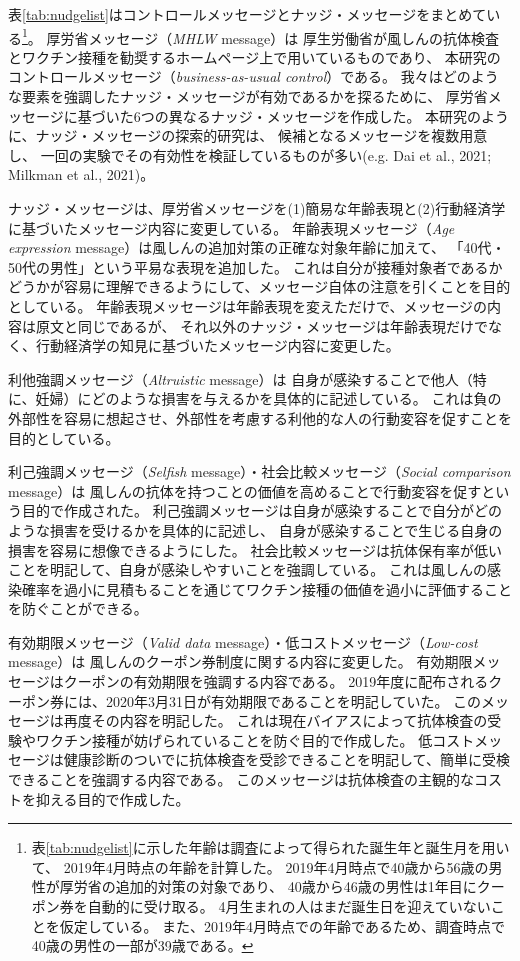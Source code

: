 \documentclass[
  11pt,
  a4paper,
]{article}
\begin{document}
表\ref{tab:nudgelist}はコントロールメッセージとナッジ・メッセージをまとめている\footnote{表\ref{tab:nudgelist}に示した年齢は調査によって得られた誕生年と誕生月を用いて、
  2019年4月時点の年齢を計算した。
  2019年4月時点で40歳から56歳の男性が厚労省の追加的対策の対象であり、
  40歳から46歳の男性は1年目にクーポン券を自動的に受け取る。
  4月生まれの人はまだ誕生日を迎えていないことを仮定している。
  また、2019年4月時点での年齢であるため、調査時点で40歳の男性の一部が39歳である。}。
厚労省メッセージ（\emph{MHLW} message）は
厚生労働省が風しんの抗体検査とワクチン接種を勧奨するホームページ上で用いているものであり、
本研究のコントロールメッセージ（\emph{business-as-usual control}）である。
我々はどのような要素を強調したナッジ・メッセージが有効であるかを探るために、
厚労省メッセージに基づいた6つの異なるナッジ・メッセージを作成した。
本研究のように、ナッジ・メッセージの探索的研究は、
候補となるメッセージを複数用意し、
一回の実験でその有効性を検証しているものが多い(e.g. Dai et al., 2021; Milkman et al., 2021)。

ナッジ・メッセージは、厚労省メッセージを(1)簡易な年齢表現と(2)行動経済学に基づいたメッセージ内容に変更している。
年齢表現メッセージ（\emph{Age expression} message）は風しんの追加対策の正確な対象年齢に加えて、
「40代・50代の男性」という平易な表現を追加した。
これは自分が接種対象者であるかどうかが容易に理解できるようにして、メッセージ自体の注意を引くことを目的としている。
年齢表現メッセージは年齢表現を変えただけで、メッセージの内容は原文と同じであるが、
それ以外のナッジ・メッセージは年齢表現だけでなく、行動経済学の知見に基づいたメッセージ内容に変更した。

利他強調メッセージ（\emph{Altruistic} message）は
自身が感染することで他人（特に、妊婦）にどのような損害を与えるかを具体的に記述している。
これは負の外部性を容易に想起させ、外部性を考慮する利他的な人の行動変容を促すことを目的としている。

利己強調メッセージ（\emph{Selfish} message）・社会比較メッセージ（\emph{Social comparison} message）は
風しんの抗体を持つことの価値を高めることで行動変容を促すという目的で作成された。
利己強調メッセージは自身が感染することで自分がどのような損害を受けるかを具体的に記述し、
自身が感染することで生じる自身の損害を容易に想像できるようにした。
社会比較メッセージは抗体保有率が低いことを明記して、自身が感染しやすいことを強調している。
これは風しんの感染確率を過小に見積もることを通じてワクチン接種の価値を過小に評価することを防ぐことができる。

有効期限メッセージ（\emph{Valid data} message）・低コストメッセージ（\emph{Low-cost} message）は
風しんのクーポン券制度に関する内容に変更した。
有効期限メッセージはクーポンの有効期限を強調する内容である。
2019年度に配布されるクーポン券には、2020年3月31日が有効期限であることを明記していた。
このメッセージは再度その内容を明記した。
これは現在バイアスによって抗体検査の受験やワクチン接種が妨げられていることを防ぐ目的で作成した。
低コストメッセージは健康診断のついでに抗体検査を受診できることを明記して、簡単に受検できることを強調する内容である。
このメッセージは抗体検査の主観的なコストを抑える目的で作成した。
\end{document}
